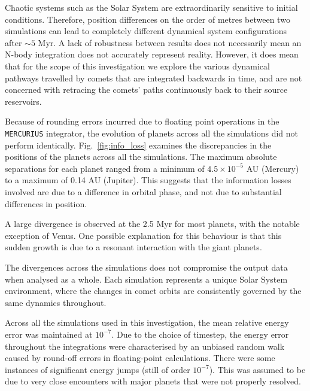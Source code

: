 Chaotic systems such as the Solar System are extraordinarily sensitive to initial conditions. Therefore, position differences on the order of metres between two simulations can lead to completely different dynamical system configurations after $\sim5$ Myr. A lack of robustness between results does not necessarily mean an N-body integration does not accurately represent reality. However, it does mean that for the scope of this investigation we explore the various dynamical pathways travelled by comets that are integrated backwards in time, and are not concerned with retracing the comets' paths continuously back to their source reservoirs.

Because of rounding errors incurred due to floating point operations in the \texttt{MERCURIUS} integrator, the evolution of planets across all the simulations did not perform identically. Fig.~\ref{fig:info_loss} examines the discrepancies in the positions of the planets across all the simulations. The maximum absolute separations for each planet ranged from a minimum of $4.5\times10^{-5}$ AU (Mercury) to a maximum of 0.14 AU (Jupiter). This suggests that the information losses involved are due to a difference in orbital phase, and not due to substantial differences in position.

A large divergence is observed at the 2.5 Myr for most planets, with the notable exception of Venus. One possible explanation for this behaviour is that this sudden growth is due to a resonant interaction with the giant planets.

The divergences across the simulations does not compromise the output data when analysed as a whole. Each simulation represents a unique Solar System environment, where the changes in comet orbits are consistently governed by the same dynamics throughout. 

Across all the simulations used in this investigation, the mean relative energy error was maintained at $10^{-7}$. Due to the choice of timestep, the energy error throughout the integrations were characterised by an unbiased random walk caused by round-off errors in floating-point calculations. There were some instances of significant energy jumps (still of order $10^{-7}$). This was assumed to be due to very close encounters with major planets that were not properly resolved.

\iffalse
\begin{figure}[t!]
    \centering
    \texttt{[image: error.pdf]}
    \caption[]{}
    \label{fig:error}
\end{figure}
\fi

